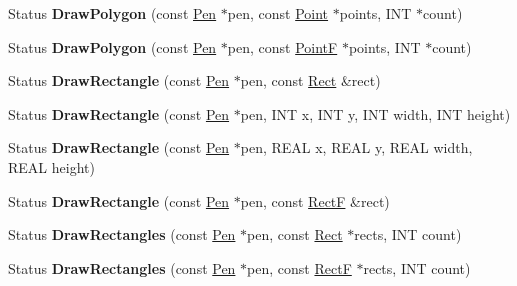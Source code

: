 \begin{DoxyCompactItemize}
\mbox{\label{class_graphics_a98dbbbbddeb71bbbaef11335719c33e0}} 
Status {\bfseries Draw\+Polygon} (const \hyperlink{class_pen}{Pen} $\ast$pen, const \hyperlink{struct_point}{Point} $\ast$points, I\+NT $\ast$count)
\item 
\mbox{\label{class_graphics_a7f25140d7702b263aa6491fb4d5fbdd0}} 
Status {\bfseries Draw\+Polygon} (const \hyperlink{class_pen}{Pen} $\ast$pen, const \hyperlink{struct_point_f}{PointF} $\ast$points, I\+NT $\ast$count)
\item 
\mbox{\label{class_graphics_a7096e146ace4d8127dd512fa5794929e}} 
Status {\bfseries Draw\+Rectangle} (const \hyperlink{class_pen}{Pen} $\ast$pen, const \hyperlink{struct_rect}{Rect} \&rect)
\item 
\mbox{\label{class_graphics_a9b5616a3cde87ea45bc9ee68f54eaf3e}} 
Status {\bfseries Draw\+Rectangle} (const \hyperlink{class_pen}{Pen} $\ast$pen, I\+NT x, I\+NT y, I\+NT width, I\+NT height)
\item 
\mbox{\label{class_graphics_aea6ef4a41862d95a46e4dea495822dd9}} 
Status {\bfseries Draw\+Rectangle} (const \hyperlink{class_pen}{Pen} $\ast$pen, R\+E\+AL x, R\+E\+AL y, R\+E\+AL width, R\+E\+AL height)
\item 
\mbox{\label{class_graphics_ab229b499892d1938e051a114d8b1af92}} 
Status {\bfseries Draw\+Rectangle} (const \hyperlink{class_pen}{Pen} $\ast$pen, const \hyperlink{struct_rect_f}{RectF} \&rect)
\item 
\mbox{\label{class_graphics_a6ae320f7a8bd1585f72e7660490646aa}} 
Status {\bfseries Draw\+Rectangles} (const \hyperlink{class_pen}{Pen} $\ast$pen, const \hyperlink{struct_rect}{Rect} $\ast$rects, I\+NT count)
\item 
\mbox{\label{class_graphics_aa029d5d1c8b2c4909cd82b5520a28b51}} 
Status {\bfseries Draw\+Rectangles} (const \hyperlink{class_pen}{Pen} $\ast$pen, const \hyperlink{struct_rect_f}{RectF} $\ast$rects, I\+NT count)
\item 
\mbox{\label{class_graphics_a399b3fc93f088d0b7eba045caa735b6e}} 

\end{DoxyCompactItemize}
